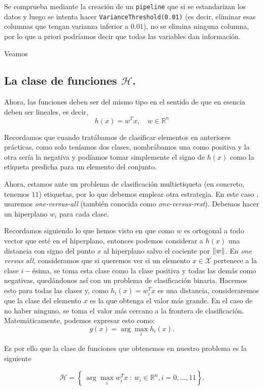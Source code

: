 \documentclass[a4paper, 20pt]{article}
\newcommand{\R}{\mathbb R}
\begin{document}
Se comprueba mediante la creación de un \lstinline{pipeline} que si se estandarizan los datos y luego se intenta hacer \lstinline{VarianceThreshold(0.01)} (es decir, eliminar esas columnas que tengan varianza inferior a $0.01$), no se elimina ninguna columna, por lo que a priori podríamos decir que todas las variables dan información.

Veamos 



\subsection{La clase de funciones $\mathcal H$.}


Ahora, las funciones deben ser del mismo tipo en el sentido de que en esencia deben ser lineales, es decir,
$$
h(x) = w^T x, \quad w \in \R^n
$$

Recordamos que cuando tratábamos de clasificar elementos en anteriores prácticas, como solo teníamos dos clases, nombrábamos una como positiva y la otra sería la negativa y podíamos tomar simplemente el signo de $h(x)$ como la etiqueta predicha para un elemento del conjunto. 

Ahora, estamos ante un problema de clasificación multietiqueta (en concreto, tenemos $11$) etiquetas, por lo que debemos emplear otra estrategia. En este caso , usaremos \emph{one-versus-all} (también conocida como \emph{one-versus-rest}). Debemos hacer un hiperplano $w_i$ para cada clase. 

Recordamos siguiendo lo que hemos visto en 
que como $w$ es ortogonal a todo vector que esté en el hiperplano, entonces podemos considerar a $h(x)$ una distancia con signo del punto $x$ al hiperplano salvo el cociente por $\norm{w}$. En \emph{one versus all}, consideramos que si queremos ver si un elemento $x \in \mathcal X$ pertenece a la clase $i-$ésima, se toma esta clase como la clase positiva y todas las demás como negativas, quedándonos así con un problema de clasificación binaria. Hacemos esto para todas las clases y, como $h_i(x) = w_i^T x$ es una distancia, consideraremos que la clase del elemento $x$ es la que obtenga el valor más grande. En el caso de no haber ninguno, se toma el valor más cercano a la frontera de clasificación. Matemáticamente, podemos expresar esto como:
$$
g(x) = \arg \max_i h_i(x).
$$

Es por ello que la clase de funciones que obtenemos en nuestro problema es la siguiente

$$
\mathcal H = \left\{ \ \arg \max_i w_i^T x  \ : \ w_i \in \R^n, i = 0,\dots,11\right\}.
$$
\end{document}
